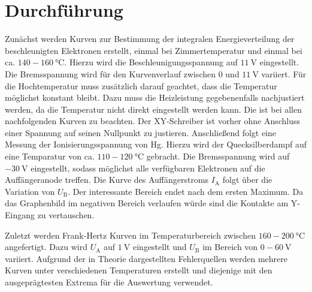 
\section{Durchführung}
\label{sec:Durchführung}
Zunächst werden Kurven zur Bestimmung der integralen Energieverteilung der
beschleunigten Elektronen erstellt, einmal bei Zimmertemperatur und einmal bei
ca. $140- \SI{160}{\degreeCelsius}$. Hierzu wird die Beschleunigungsspannung auf
$\SI{11}{\volt}$ eingestellt. Die Bremsspannung wird für den Kurvenverlauf
zwischen $0$ und $\SI{11}{\volt}$ variiert. Für die Hochtemperatur muss zusätzlich
darauf geachtet, dass die Temperatur möglichst konstant bleibt. Dazu muss die
Heizleistung gegebenenfalls nachjustiert werden, da die Temperatur nicht direkt
eingestellt werden kann. Die ist bei allen nachfolgenden Kurven zu beachten. Der
XY-Schreiber ist vorher ohne Anschluss einer Spannung auf seinen Nullpunkt zu justieren.
Anschließend folgt eine Messung der Ionisierungsspannung von Hg. Hierzu wird der
Quecksilberdampf auf eine Temparatur von ca. $110- \SI{120}{\degreeCelsius}$ gebracht.
Die Bremsspannung wird auf $\SI{-30}{\volt}$ eingestellt, sodass möglichst alle
verfügbaren Elektronen auf die Auffängeranode treffen. Die Kurve des Auffängerstroms
$I_\text{A}$ folgt über die Variation von $U_\text{B}$. Der interessante Bereich endet
nach dem ersten Maximum. Da das Graphenbild im negativen Bereich verlaufen würde sind die
Kontakte am Y-Eingang zu vertauschen.

Zuletzt werden Frank-Hertz Kurven im Temperaturbereich zwischen $160-\SI{200}{\degreeCelsius}$
angefertigt. Dazu wird $U_\text{A}$ auf $\SI{1}{\volt}$ eingestellt und $U_\text{B}$
im Bereich von $0-\SI{60}{\volt}$ variiert. Aufgrund der in Theorie dargestellten
Fehlerquellen werden mehrere Kurven unter verschiedenen Temperaturen erstellt und
diejenige mit den ausgeprägtesten Extrema für die Auswertung verwendet.

